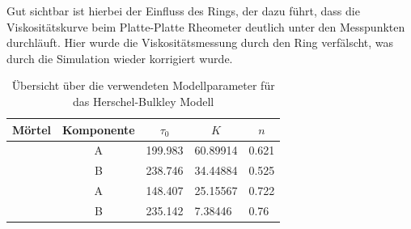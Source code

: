 Gut sichtbar ist hierbei der Einfluss des Rings, der dazu führt, dass die Viskositätskurve beim Platte-Platte Rheometer deutlich unter den Messpunkten durchläuft.
Hier wurde die Viskositätsmessung durch den Ring verfälscht, was durch die Simulation wieder korrigiert wurde.
\begin{table}
    \centering
    \begin{tabular}{l c l l l}
        \textbf{Mörtel} & \textbf{Komponente} & 
        \multicolumn{1}{c}{$\tau_0$} &
        \multicolumn{1}{c}{$K$} &
        \multicolumn{1}{c}{$n$} \\
        \hline
        \hline
        \multirow{2}{*}{\hit{}} & A & 199.983 & 60.89914 & 0.621 \\ 
                                & B & 238.746 & 34.44884 & 0.525 \\ 
        \hline
        \multirow{2}{*}{\re{}}  & A & 148.407 & 25.15567 & 0.722 \\ 
                                & B & 235.142 & 7.38446  & 0.76
    \end{tabular}
    \caption{Übersicht über die verwendeten Modellparameter für das Herschel-Bulkley Modell}
    \label{fig:resultParameter}
\end{table}
%

